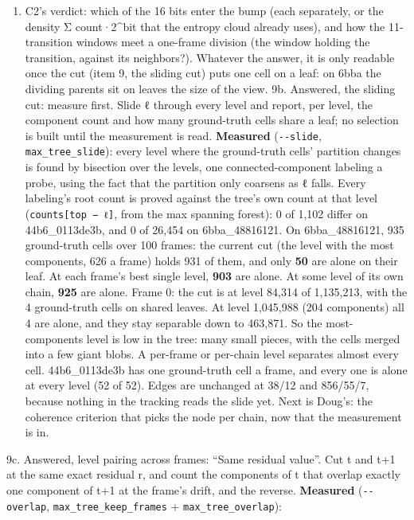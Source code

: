\begin{enumerate}
\item C2's verdict: which of the 16 bits enter the bump (each separately, or the density Σ count·2\textasciicircum{}bit that the entropy cloud already uses), and how the 11-transition windows meet a one-frame division (the window holding the transition, against its neighbors?). Whatever the answer, it is only readable once the cut (item 9, the sliding cut) puts one cell on a leaf: on 6bba the dividing parents sit on leaves the size of the view. 9b. Answered, the sliding cut: measure first. Slide ℓ through every level and report, per level, the component count and how many ground-truth cells share a leaf; no selection is built until the measurement is read. \textbf{Measured} (\texttt{-\allowbreak{}-\allowbreak{}slide}, \texttt{max\_\allowbreak{}tree\_\allowbreak{}slide}): every level where the ground-truth cells' partition changes is found by bisection over the levels, one connected-component labeling a probe, using the fact that the partition only coarsens as ℓ falls. Every labeling's root count is proved against the tree's own count at that level (\texttt{counts[top − ℓ]}, from the max spanning forest): 0 of 1,102 differ on 44b6\_\allowbreak{}0113de3b, and 0 of 26,454 on 6bba\_\allowbreak{}48816121. On 6bba\_\allowbreak{}48816121, 935 ground-truth cells over 100 frames: the current cut (the level with the most components, 626 a frame) holds 931 of them, and only \textbf{50} are alone on their leaf. At each frame's best single level, \textbf{903} are alone. At some level of its own chain, \textbf{925} are alone. Frame 0: the cut is at level 84,314 of 1,135,213, with the 4 ground-truth cells on shared leaves. At level 1,045,988 (204 components) all 4 are alone, and they stay separable down to 463,871. So the most-components level is low in the tree: many small pieces, with the cells merged into a few giant blobs. A per-frame or per-chain level separates almost every cell. 44b6\_\allowbreak{}0113de3b has one ground-truth cell a frame, and every one is alone at every level (52 of 52). Edges are unchanged at 38/12 and 856/55/7, because nothing in the tracking reads the slide yet. Next is Doug's: the coherence criterion that picks the node per chain, now that the measurement is in.
\end{enumerate}

9c. Answered, level pairing across frames: “Same residual value”. Cut t and t+1 at the same exact residual r, and count the components of t that overlap exactly one component of t+1 at the frame's drift, and the reverse. \textbf{Measured} (\texttt{-\allowbreak{}-\allowbreak{}overlap}, \texttt{max\_\allowbreak{}tree\_\allowbreak{}keep\_\allowbreak{}frames} + \texttt{max\_\allowbreak{}tree\_\allowbreak{}overlap}):

